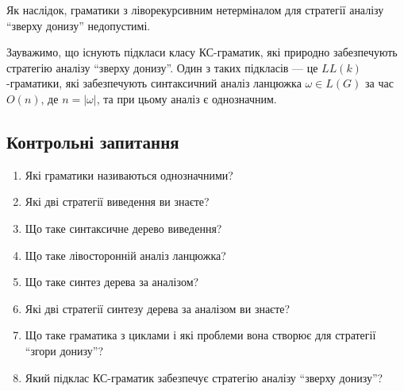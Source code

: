 Як наслідок, граматики з ліворекурсивним нетерміналом для стратегії аналізу ``зверху донизу'' недопустимі. \medskip %

Зауважимо, що існують підкласи класу КС-граматик, які природно забезпечують стратегію аналізу ``зверху донизу''. Один з таких підкласів --- це $LL(k)$-граматики, які забезпечують синтаксичний аналіз ланцюжка $\omega \in L(G)$ за час $O(n)$, де $n = \vert \omega \vert$, та при цьому аналіз є однозначним.

\subsection{Контрольні запитання}

\begin{enumerate}
	\item Які граматики називаються однозначними? %
	\item Які дві стратегії виведення ви знаєте? %
	\item Що таке синтаксичне дерево виведення? %
	\item Що таке лівосторонній аналіз ланцюжка? %
	\item Що таке синтез дерева за аналізом? %
	\item Які дві стратегії синтезу дерева за аналізом ви знаєте? %
	\item Що таке граматика з циклами і які проблеми вона створює для стратегії ``згори донизу''? %
	\item Який підклас КС-граматик забезпечує стратегію аналізу ``зверху донизу''? %
\end{enumerate}
